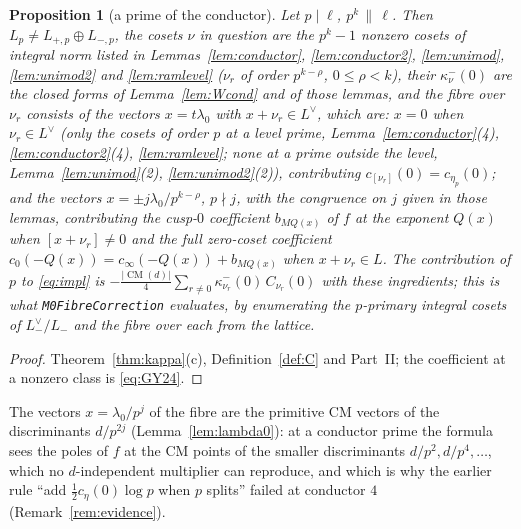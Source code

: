 \documentclass[11pt,reqno]{amsart}
\theoremstyle{plain}
\newtheorem{proposition}[theorem]{Proposition}
\theoremstyle{definition}
\DeclareMathOperator{\CM}{CM}
\newcommand{\Ldual}{L^{\vee}}
\newcommand{\Lm}{L_{-}}
\begin{document}
\begin{proposition}[a prime of the conductor]\label{prop:conductor}
Let $p\mid\ell$, $p^k\,\|\,\ell$. Then $L_p\neq L_{+,p}\oplus L_{-,p}$, the cosets $\nu$ in
question are the $p^k-1$ nonzero cosets of integral norm listed in Lemmas~\ref{lem:conductor},
\ref{lem:conductor2}, \ref{lem:unimod}, \ref{lem:unimod2} and \ref{lem:ramlevel} ($\nu_r$ of
order $p^{k-\rho}$, $0\le\rho<k$), their $\kappa^-_\nu(0)$ are the closed forms of
Lemma~\ref{lem:Wcond} and of those lemmas, and the fibre over $\nu_r$ consists of the vectors
$x=t\lambda_0$ with $x+\nu_r\in\Ldual$, which are: $x=0$ when $\nu_r\in\Ldual$ (only the cosets of
order $p$ at a level prime, Lemma~\ref{lem:conductor}(4), \ref{lem:conductor2}(4),
\ref{lem:ramlevel}; none at a prime outside the level, Lemma~\ref{lem:unimod}(2),
\ref{lem:unimod2}(2)), contributing $c_{[\nu_r]}(0)=c_{\eta_p}(0)$; and the vectors
$x=\pm j\lambda_0/p^{k-\rho}$, $p\nmid j$, with the congruence on $j$ given in those lemmas,
contributing the cusp-$0$ coefficient $b_{MQ(x)}$ of $f$ at the exponent $Q(x)$ when $[x+\nu_r]\ne0$
and the full zero-coset coefficient $c_0(-Q(x))=c_\infty(-Q(x))+b_{MQ(x)}$ when $x+\nu_r\in L$.
The contribution of $p$ to \eqref{eq:impl} is $-\frac{|\CM(d)|}4\sum_{r\ne0}\kappa^-_{\nu_r}(0)
\,C_{\nu_r}(0)$ with these ingredients; this is what \texttt{M0FibreCorrection} evaluates, by
enumerating the $p$-primary integral cosets of $\Lm^\vee/\Lm$ and the fibre over each from the
lattice.
\end{proposition}
\begin{proof}
Theorem~\ref{thm:kappa}(c), Definition~\ref{def:C} and Part~II; the coefficient at a nonzero class
is \eqref{eq:GY24}.
\end{proof}

The vectors $x=\lambda_0/p^j$ of the fibre are the primitive CM vectors of the discriminants
$d/p^{2j}$ (Lemma~\ref{lem:lambda0}): at a conductor prime the formula sees the poles of $f$ at the
CM points of the smaller discriminants $d/p^2,d/p^4,\dots$, which no $d$-independent multiplier can
reproduce, and which is why the earlier rule ``add $\tfrac12c_\eta(0)\log p$ when $p$ splits''
failed at conductor $4$ (Remark~\ref{rem:evidence}).
\end{document}
